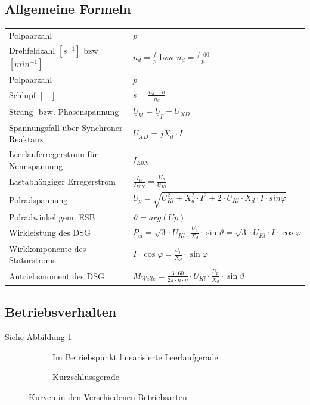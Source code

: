     \subsection{Allgemeine Formeln}
    \begin{tabular}[c]{ | p{7cm} | p{8cm} |}
    	\hline
    	Polpaarzahl	& $p$\\
    	Drehfeldzahl $[s^{-1}]$ bzw $[min^{-1}]$ & $n_d=\frac{f}{p}$ bzw
    	$n_d=\frac{f\cdot 60}{p}$\\
    	\hline
    	Polpaarzahl & $p$ \\
    	\hline
    	Schlupf $[-]$ & $s=\frac{n_d-n}{n_d}$\\
    	\hline
    	Strang- bzw. Phasenspannung &
    	$\underline{U}_{kl}=\underline{U}_p+U_{XD}$\\
    	\hline
    	Spannungsfall über Synchroner Reaktanz & $U_{XD}=jX_d\cdot\underline{I}$\\
    	\hline
    	Leerlauferregerstrom für Nennspannung & $I_{E0N}$\\
    	\hline
    	Lastabhängiger Erregerstrom & $\frac{I_E}{I_{E0N}}=\frac{U_p}{U_{Kl}}$\\
    	\hline
    	Polradspannung & $U_p=\sqrt{U_{Kl}^2+X_d^2\cdot I^2+2\cdot U_{Kl}\cdot
    	X_d \cdot I\cdot sin \varphi}$\\
    	\hline
    	Polradwinkel gem. ESB & $\vartheta = arg(Up)$\\
    	\hline
    	Wirkleistung des DSG & $P_{el}=\sqrt{3}\cdot
    	U_{Kl}\cdot\frac{U_p}{X_d}\cdot \sin\vartheta = \sqrt{3} \cdot U_{Kl} \cdot I \cdot \cos{\varphi}$\\
    	\hline
    	Wirkkomponente des Statorstroms & $I \cdot \cos{\varphi} = \frac{U_p}{X_d} \cdot \sin{\varphi}$ \\
    	\hline
    	Antriebsmoment des DSG & $M_{Welle}=\frac{3\cdot60}{2\pi\cdot n \cdot
    	\eta}\cdot U_{Kl}\cdot\frac{U_p}{X_d}\cdot\sin\vartheta$\\
    	\hline
    \end{tabular}

    \subsection{Betriebsverhalten}
    	Siehe Abbildung \ref{fig:betriebsverhalten}
    	\begin{figure}[h!]
	    	\centering
	    	\begin{subfigure}[t]{0.45\textwidth}
	    		\centering
	    		\caption{Im Betriebspunkt linearisierte Leerlaufgerade}
	    	\end{subfigure}
	    	\begin{subfigure}[t]{0.45\textwidth}
	    		\centering
	    		\caption{Kurzschlussgerade}
	        \end{subfigure}
	        \caption{Kurven in den Verschiedenen Betriebsarten}
	        \label{fig:betriebsverhalten}
    	\end{figure}
    	
